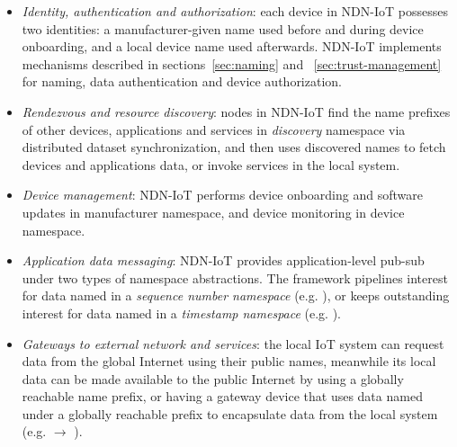 \begin{itemize}

\item \textit{Identity, authentication and authorization}: each device in NDN-IoT possesses two identities: a manufacturer-given name used before and during device onboarding, and a local device name used afterwards. NDN-IoT implements mechanisms described in sections~\ref{sec:naming} and ~\ref{sec:trust-management} for naming, data authentication and device authorization. 

\item \textit{Rendezvous and resource discovery}: nodes in NDN-IoT find the name prefixes of other devices, applications and services in \textit{discovery} namespace via distributed dataset synchronization, and then uses discovered names to fetch devices and applications data, or invoke services in the local system. 

\item \textit{Device management}: NDN-IoT performs device onboarding and software updates in manufacturer namespace, and device monitoring in device namespace. 

\item \textit{Application data messaging}: NDN-IoT provides application-level pub-sub under two types of namespace abstractions. The framework pipelines interest for data named in a \textit{sequence number namespace} (e.g. ), or keeps outstanding interest for data named in a \textit{timestamp namespace} (e.g. ).

\item \textit{Gateways to external network and services}: the local IoT system can request data from the global Internet using their public names, meanwhile its local data can be made available to the public Internet by using a globally reachable name prefix, or having a gateway device that uses data named under a globally reachable prefix to encapsulate data from the local system (e.g.  $\rightarrow$ ).

\end{itemize}

